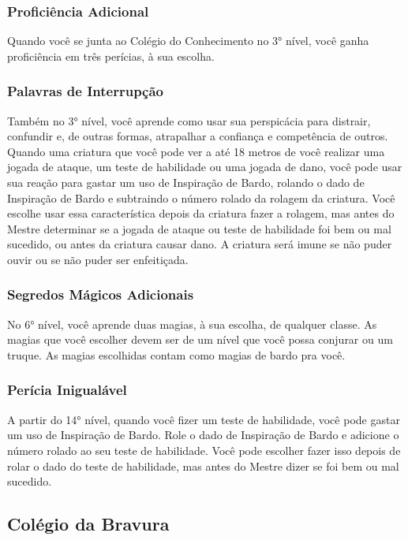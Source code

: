 \documentclass{RPG_Adventure}[2021/10/20]
\begin{document}
\subsubsection*{Proficiência Adicional}%

Quando você se junta ao Colégio do Conhecimento no 3° nível, você ganha
proficiência em três perícias, à sua escolha.

\subsubsection*{Palavras de Interrupção}%

Também no 3° nível, você aprende como usar sua perspicácia para distrair,
confundir e, de outras formas, atrapalhar a confiança e competência de outros.
Quando uma criatura que você pode ver a até 18 metros de você realizar uma
jogada de ataque, um teste de habilidade ou uma jogada de dano, você pode usar
sua reação para gastar um uso de Inspiração de Bardo, rolando o dado de
Inspiração de Bardo e subtraindo o número rolado da rolagem da criatura. Você
escolhe usar essa característica depois da criatura fazer a rolagem, mas antes
do Mestre determinar se a jogada de ataque ou teste de habilidade foi bem ou mal
sucedido, ou antes da criatura causar dano. A criatura será imune se não puder
ouvir ou se não puder ser enfeitiçada.

\subsubsection*{Segredos Mágicos Adicionais}%

No 6° nível, você aprende duas magias, à sua escolha, de qualquer classe. As
magias que você escolher devem ser de um nível que você possa conjurar ou um
truque. As magias escolhidas contam como magias de bardo pra você.

\subsubsection*{Perícia Inigualável}%

A partir do 14° nível, quando você fizer um teste de habilidade, você pode
gastar um uso de Inspiração de Bardo. Role o dado de Inspiração de Bardo e
adicione o número rolado ao seu teste de habilidade. Você pode escolher fazer
isso depois de rolar o dado do teste de habilidade, mas antes do Mestre dizer se
foi bem ou mal sucedido.

\subsection*{Colégio da Bravura}%
\label{sub:colegio_da_bravura}
\end{document}
